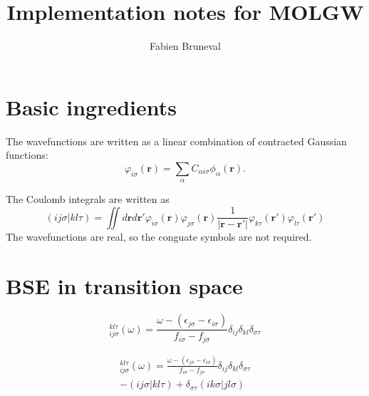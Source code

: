 \documentclass[aps,prb,reprint,showpacs]{revtex4-1}
\def\br{\mathbf{r}}
\begin{document}
\title{Implementation notes for \textsc{MOLGW}}
\author{Fabien Bruneval}

\maketitle






\section{Basic ingredients}

The wavefunctions are written as a linear combination of contracted Gaussian functions:
\begin{equation}
 \varphi_{i\sigma} (\br) = \sum_{\alpha} C_{\alpha i \sigma} \phi_\alpha(\br) .
\end{equation}

The Coulomb integrals are written as
\begin{equation}
 ( i j \sigma | k l \tau ) = \iint d\br d\br' \varphi_{i\sigma} (\br)  \varphi_{j\sigma} (\br) \frac{1}{|\br-\br'|}  \varphi_{k\tau}(\br') \varphi_{l\tau}(\br')
\end{equation}
The wavefunctions are real, so the conguate symbols are not required.



\section{BSE in transition space}

\begin{equation}
  [\chi_0^{-1}]_{ij \sigma}^{kl \tau}(\omega) =  
     \frac{ \omega - (\epsilon_{j\sigma} - \epsilon_{i\sigma} ) }
          {   f_{i\sigma}  - f_{j\sigma} } \delta_{ij} \delta_{kl} \delta_{\sigma\tau} 
\end{equation}

\begin{multline}
  [\chi^{-1}]_{ij \sigma}^{kl \tau}(\omega) =  
     \frac{ \omega - (\epsilon_{j\sigma} - \epsilon_{i\sigma} ) }
          {   f_{i\sigma}  - f_{j\sigma} } \delta_{ij} \delta_{kl} \delta_{\sigma\tau}  \\
    - ( ij \sigma | kl \tau )
    + \delta_{\sigma\tau} ( ik \sigma | jl \sigma) 
\end{multline}
\end{document}
